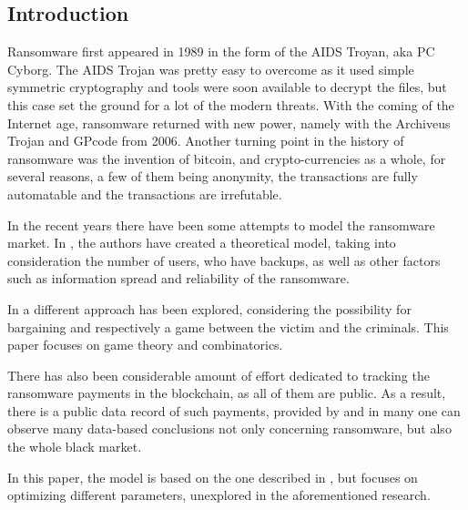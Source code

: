 \documentclass[11pt, a4paper]{article}
\theoremstyle{definition}
\begin{document}
		\subsection{Introduction}
			Ransomware first appeared in 1989 in the form of the AIDS Troyan, aka PC Cyborg.  The AIDS Trojan was pretty easy to overcome as it used simple symmetric cryptography and tools were soon available to decrypt the files, but this case set the ground for a lot of the modern threats. With the coming of the Internet age, ransomware returned with new power, namely with the Archiveus Trojan and GPcode from 2006. Another turning point in the history of ransomware was the invention of bitcoin, and crypto-currencies as a whole, for several reasons, a few of them being anonymity, the transactions are fully automatable and the transactions are irrefutable\cite{huang2018tracking}.\par
			In the recent years there have been some attempts to model the ransomware market. In \cite{caulfielddynamic}, the authors have created a theoretical model, taking into consideration the number of users, who have backups, as well as other factors such as information spread and reliability of the ransomware.\par                 
			In \cite{cartwright2018pay} a different approach has been explored, considering the possibility for bargaining and respectively a game between the victim and the criminals. This paper focuses on game theory and combinatorics.\par
			There has also been considerable amount of effort dedicated to tracking the ransomware payments in the blockchain, as all of them are public. As a result, there is a public data record of such payments, provided by \cite{paquet2019ransomware} and in \cite{thomas2015framing} many one can observe many data-based conclusions not only concerning ransomware, but also the whole black market.\par
			In this paper, the model is based on the one described in \cite{caulfielddynamic}, but focuses on optimizing different parameters, unexplored in the aforementioned research.
\end{document}
